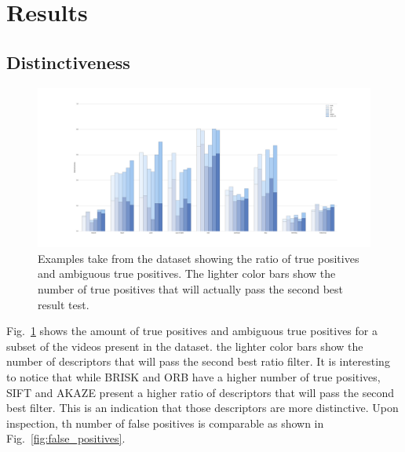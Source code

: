 \section{Results}

\subsection{Distinctiveness}

\begin{figure}[t]
\centerline{%
		\includegraphics[width=0.98\linewidth]{imgs/distinctivenessTP.pdf}}
    \vspace{-2mm} 
	\caption{Examples take from the dataset showing the ratio of true positives and ambiguous true positives. The lighter color bars show the number of true positives that will actually pass the second best result test.}
	\label{fig:distinctiveness}
\end{figure}

Fig.~\ref{fig:distinctiveness} shows the amount of true positives and ambiguous true positives for a subset of the videos present in the dataset. the lighter color bars show the number of descriptors that will pass the second best ratio filter. It is interesting to notice that while BRISK and ORB have a higher number of true positives, SIFT and AKAZE present a higher ratio of descriptors that will pass the second best filter. This is an indication that those descriptors are more distinctive. Upon inspection, th number of false positives is comparable as shown in Fig.~\ref{fig:false_positives}.

